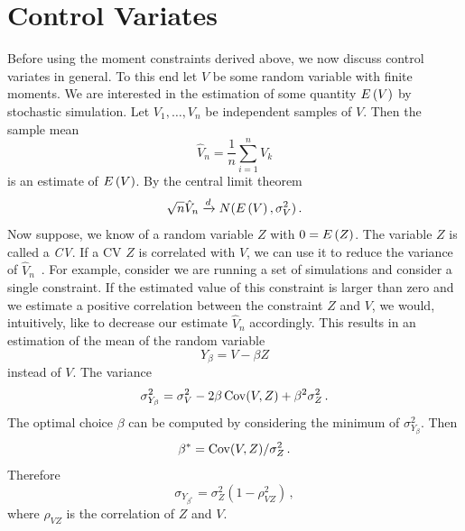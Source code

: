 \section{Control Variates}\label{sec:cv:var_red}
Before using the moment constraints derived above, we now discuss control variates in general.
To this end let $V$ be some random variable with finite moments.
We are interested in the estimation of some quantity ${E}\left(V\right)$
by stochastic simulation.
Let $V_1,\dots,V_n$ be independent samples of $V$.
Then the sample mean 
\[
	\hat{V}_n =\frac{1}{n}\sum_{i=1}^n V_k
\]
is an estimate of ${E}\left(V\right)$.  By the central limit theorem
\[
\sqrt{n}\hat{V}_n\xrightarrow{d}N({E}\left(V\right),\sigma_V^2)\,.
\]
Now suppose, we know of a random variable $Z$ with $0={E}\left(Z\right)$.
The variable $Z$ is called a \emph{\acf{CV}}.
If a \acl{CV} $Z$ is correlated with $V$, we can
use it to
reduce the variance of $\hat{V}_n$~\parencite{glasserman2005large,nelson1990control,szechtman2003control,wilson1984variance}.
For example, consider we are running a set of simulations and consider a single
constraint.
If the estimated value of this constraint is larger than zero and we estimate a positive correlation
between the constraint $Z$ and $V$, we would, intuitively, like to {decrease} our
estimate $\hat{V}_n$ accordingly.
This results in an estimation of the mean of the random variable
\[
	Y_{\beta}= V-\beta Z
\]
instead of $V$.
The variance%
\[
	\sigma_{Y_{\beta}}^2 = \sigma_V^2-2\beta \operatorname*{Cov}(V, Z) + \beta^2\sigma_Z^2\,.
\]
The optimal choice $\beta$ can be computed by  considering the minimum of $\sigma_{Y_\beta}^2$. Then
\[
	\beta^{*}={\operatorname*{Cov}(V, Z)}/{\sigma_Z^2}\,.
\]
Therefore 
\[
	\sigma_{Y_{\beta^{*}}}=\sigma_Z^2(1 - \rho_{VZ}^2)\,,
\]
where $\rho_{VZ}$ is the correlation of $Z$ and $V$.

